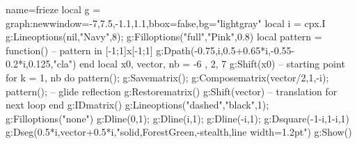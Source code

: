 \documentclass{standalone}%
\begin{document}
\begin{luadraw}{name=frieze}
local g = graph:new{window={-7,7.5,-1.1,1.1},bbox=false,bg="lightgray"}
local i = cpx.I
g:Lineoptions(nil,"Navy",8); g:Filloptions("full","Pink",0.8)
local pattern = function() -- pattern in [-1;1]x[-1;1]
    g:Dpath({-0.75,i,0.5+0.65*i,-0.55-0.2*i,0.125,"cla"})
end
local x0, vector, nb = -6 , 2, 7
g:Shift(x0) -- starting point
for k = 1, nb do
     pattern(); 
     g:Savematrix(); 
     g:Composematrix({vector/2,1,-i}); pattern(); -- glide reflection
     g:Restorematrix()
     g:Shift(vector) -- translation for next loop
end
g:IDmatrix()
g:Lineoptions("dashed","black",1); g:Filloptions("none")
g:Dline({0,1}); g:Dline({i,1}); g:Dline({-i,1}); g:Dsquare(-1-i,1-i,1)
g:Dseg({0.5*i,vector+0.5*i},"solid,ForestGreen,-stealth,line width=1.2pt")
g:Show()
\end{luadraw}
\end{document}
